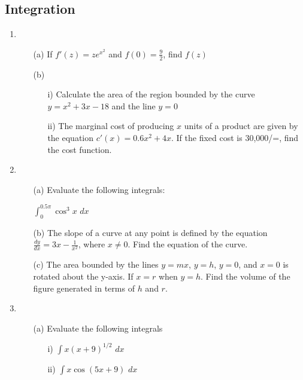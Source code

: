\subsection{Integration}

\begin{enumerate}
	\item 
	\begin{enumerate}[topsep=0ex,itemsep=0ex,partopsep=1ex,parsep=1ex]
		\item[(a)] If $f'(z) = ze^{x^2}$ and $f(0) = \frac{9}{2}$, find $f(z)$
		
		\item[(b)] 
		\begin{enumerate}[topsep=0ex,itemsep=0ex,partopsep=1ex,parsep=1ex]
			\item[i)] Calculate the area of the region bounded by the curve $y = x^2 + 3x - 18$ and the line $y = 0$
			\item[ii)] The marginal cost of producing $x$ units of a product are given by the equation $c'(x) = 0.6x^2 + 4x$. If the fixed cost is 30,000/=, find the cost function. 
		\end{enumerate}
	\end{enumerate}
	
	\item
	\begin{enumerate}[topsep=0ex,itemsep=0ex,partopsep=1ex,parsep=1ex]
		\item[(a)] Evaluate the following integrals: 
		\begin{center}
			$\int_0 ^{0.5\pi} \cos^3{x}$ $dx$
		\end{center} 
		
		\item[(b)] The slope of a curve at any point is defined by the equation $\frac{dy}{dx} = 3x - \frac{1}{x^2}$, where $x \neq 0$. Find the equation of the curve. 
		
		\item[(c)] The area bounded by the lines $y = mx$, $y = h$, $y = 0$, and $x = 0$ is rotated about the y-axis. If $x = r$ when $y = h$. Find the volume of the figure generated in terms of $h$ and $r$. 
	\end{enumerate}
	
	\item
	\begin{enumerate}[topsep=0ex,itemsep=0ex,partopsep=1ex,parsep=1ex]
		\item[(a)] Evaluate the following integrals
		\begin{enumerate}[topsep=0ex,itemsep=0ex,partopsep=1ex,parsep=1ex]
			\item[i)] $\int x(x+9)^{1/2}$ $dx$
			\item[ii)] $\int x \cos(5x + 9)$ $dx$
		\end{enumerate}
		

\end{enumerate}
\end{enumerate}
